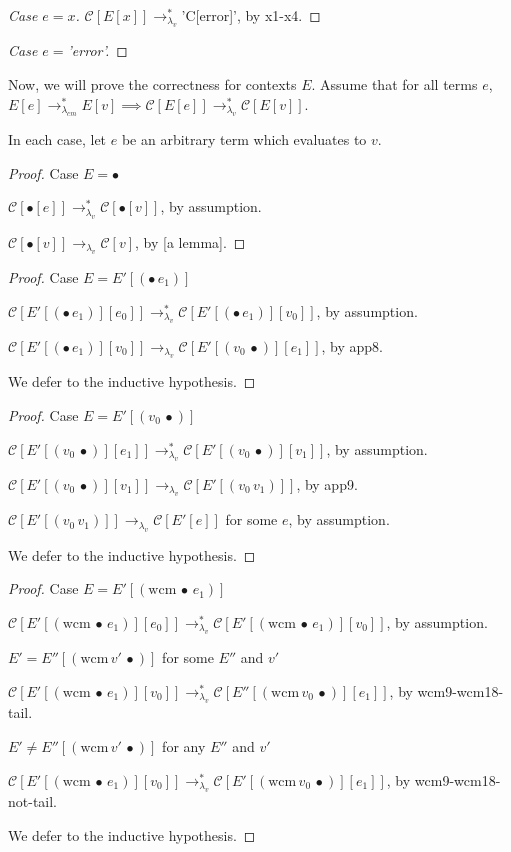 \documentclass[ms,electronic,twosidetoc,letterpaper,chaptercenter,parttop]{byumsphd}
\newcommand{\lvrr}{\rightarrow_{\lambda_v}}
\newcommand{\lvrrs}{\rightarrow_{\lambda_v}^{*}}
\newcommand{\cmrrs}{\rightarrow_{\lambda_{cm}}^{*}}
\newcommand{\C}[1]{\mathcal{C}[#1]}
\newcommand{\app}[2]{(#1\,#2)}
\newcommand{\wcm}[2]{(\mathrm{wcm}\,#1\,#2)}
\newcommand{\hole}{\bullet}
\begin{document}
\begin{proof}[Case $e=x$]
$\C{E[x]}\lvrrs$\scheme'C[error]', by x1-x4.
\end{proof}

\begin{proof}[Case $e=$\scheme'error']
\end{proof}

Now, we will prove the correctness for contexts $E$. Assume that for all terms $e$, $E[e]\cmrrs E[v]\implies\C{E[e]}\lvrrs \C{E[v]}$.

In each case, let $e$ be an arbitrary term which evaluates to $v$.

\begin{proof}{Case $E=\hole$}

$\C{\hole[e]}\lvrrs\C{\hole[v]}$, by assumption.

$\C{\hole[v]}\lvrr\C{v}$, by [a lemma].
\end{proof}

\begin{proof}{Case $E=E'[\app{\hole}{e_1}]$}

$\C{E'[\app{\hole}{e_1}][e_0]}\lvrrs\C{E'[\app{\hole}{e_1}][v_0]}$, by assumption.

$\C{E'[\app{\hole}{e_1}][v_0]}\lvrr\C{E'[\app{v_0}{\hole}][e_1]}$, by app8.

We defer to the inductive hypothesis.
\end{proof}

\begin{proof}{Case $E=E'[\app{v_0}{\hole}]$}

$\C{E'[\app{v_0}{\hole}][e_1]}\lvrrs\C{E'[\app{v_0}{\hole}][v_1]}$, by assumption.

$\C{E'[\app{v_0}{\hole}][v_1]}\lvrr\C{E'[\app{v_0}{v_1}]}$, by app9.

$\C{E'[\app{v_0}{v_1}]}\lvrr\C{E'[e]}$ for some $e$, by assumption.

We defer to the inductive hypothesis.
\end{proof}

\begin{proof}{Case $E=E'[\wcm{\hole}{e_1}]$}

$\C{E'[\wcm{\hole}{e_1}][e_0]}\lvrrs\C{E'[\wcm{\hole}{e_1}][v_0]}$, by assumption.

\begin{case}{$E'=E''[\wcm{v'}{\hole}]$ for some $E''$ and $v'$}

$\C{E'[\wcm{\hole}{e_1}][v_0]}\lvrrs\C{E''[\wcm{v_0}{\hole}][e_1]}$, by wcm9-wcm18-tail.
\end{case}

\begin{case}{$E'\ne E''[\wcm{v'}{\hole}]$ for any $E''$ and $v'$}

$\C{E'[\wcm{\hole}{e_1}][v_0]}\lvrrs\C{E'[\wcm{v_0}{\hole}][e_1]}$, by wcm9-wcm18-not-tail.
\end{case}

We defer to the inductive hypothesis.
\end{proof}
\end{document}
